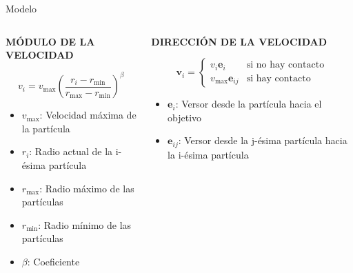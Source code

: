 \documentclass[aspectratio=169]{beamer}
\begin{document}
\begin{frame}{Modelo}
    \begin{columns}
        \begin{column}{0.5\textwidth}
            {\centering\textbf{MÓDULO DE LA VELOCIDAD}\par}
            \vspace{0.5em}
            \[
                v_i = v_{\text{max}}\left(\frac{r_i - r_{\text{min}}}{r_{\text{max}} - r_{\text{min}}}\right)^\beta
            \]
            \vspace{0.5em}
            \begin{itemize}
                \item $v_{\text{max}}$: Velocidad máxima de la partícula
                \item $r_i$: Radio actual de la i-ésima partícula
                \item $r_{\text{max}}$: Radio máximo de las partículas
                \item $r_{\text{min}}$: Radio mínimo de las partículas
                \item $\beta$: Coeficiente
            \end{itemize}
        \end{column}
        \begin{column}{0.5\textwidth}
            {\centering\textbf{DIRECCIÓN DE LA VELOCIDAD}\par}
            \vspace{0.5em}
            \[
                \mathbf{v}_i = \begin{cases}
                    v_i\mathbf{e}_i & \text{si no hay contacto} \\
                    v_{\text{max}}\mathbf{e}_{ij} & \text{si hay contacto}
                \end{cases}
            \]
            \vspace{0.5em}
            \begin{itemize}
                \item $\mathbf{e}_i$: Versor desde la partícula hacia el objetivo
                \item $\mathbf{e}_{ij}$: Versor desde la j-ésima partícula hacia la i-ésima partícula
            \end{itemize}
        \end{column}
    \end{columns}
\end{frame}
\end{document}
